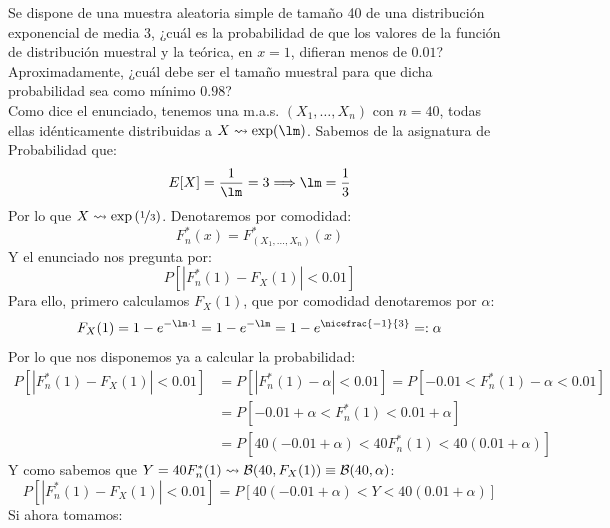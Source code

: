 \begin{ejercicio}
    Se dispone de una muestra aleatoria simple de tamaño 40 de una distribución exponencial de media 3, ¿cuál es la probabilidad de que los valores de la función de distribución muestral y la teórica, en $x=1$, difieran menos de $0.01$? Aproximadamente, ¿cuál debe ser el tamaño muestral para que dicha probabilidad sea como mínimo $0.98$?\\

    \noindent
    Como dice el enunciado, tenemos una m.a.s. $(X_1, \ldots, X_n)$ con $n=40$, todas ellas idénticamente distribuidas a $X\rightsquigarrow \exp(\lm)$. Sabemos de la asignatura de Probabilidad que:
    \begin{equation*}
        E[X] = \dfrac{1}{\lm} = 3 \Longrightarrow \lm = \dfrac{1}{3}
    \end{equation*}
    Por lo que $X\rightsquigarrow \exp\left(\nicefrac{1}{3}\right)$. Denotaremos por comodidad:
    \begin{equation*}
        F_n^\ast(x) = F_{(X_1, \ldots, X_n)}^\ast(x) 
    \end{equation*}
    Y el enunciado nos pregunta por:
    \begin{equation*}
        P[|F_n^\ast(1) - F_X(1)| < 0.01]
    \end{equation*}
    Para ello, primero calculamos $F_X(1)$, que por comodidad denotaremos por $\alpha$:
    \begin{equation*}
        F_X(1) = 1 - e^{-\lm\cdot  1} = 1-e^{-\lm} = 1-e^{\nicefrac{-1}{3}} =: \alpha
    \end{equation*}
    Por lo que nos disponemos ya a calcular la probabilidad:
    \begin{align*}
        P[|F_n^\ast(1) - F_X(1)| < 0.01] &= P[|F_n^\ast(1) - \alpha| < 0.01] = P[-0.01 < F_n^\ast(1) - \alpha < 0.01] \\
                                         &= P[-0.01+\alpha < F_n^\ast(1) < 0.01+\alpha] \\
                                         &= P[40(-0.01+\alpha) < 40F_n^\ast(1) < 40(0.01+\alpha)]
    \end{align*}
    Y como sabemos que $Y = 40F_n^\ast(1) \rightsquigarrow \mathcal{B}(40, F_X(1)) \equiv \mathcal{B}(40, \alpha)$:
    \begin{equation*}
        P[|F_n^\ast(1) - F_X(1)| < 0.01] = P[40(-0.01+\alpha) < Y< 40(0.01+\alpha)] 
    \end{equation*}
    Si ahora tomamos:
    \begin{equation*}

\end{equation*}
\end{ejercicio}
